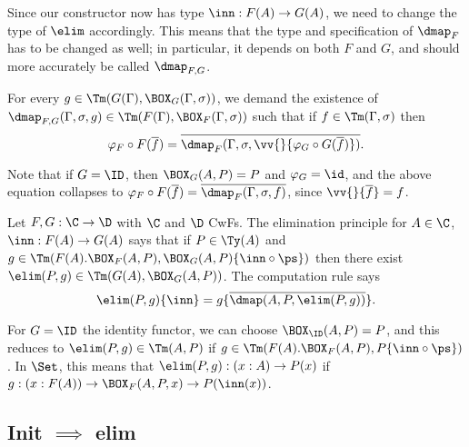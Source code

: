 \documentclass{article}
\begin{document}
Since our constructor now has type $\inn : F(A) \to G(A)$, we need to
change the type of $\elim$ accordingly. This means that the type and
specification of $\dmap_F$ has to be changed as well; in particular,
it depends on both $F$ and $G$, and should more accurately be called $\dmap_{F,G}$.

\begin{definition}
For every $g \in \Tm(G(\Gamma), \BOX_G(\Gamma, \sigma))$, we demand the existence of
$\dmap_{F,G}(\Gamma, \sigma, g) \in \Tm(F(\Gamma), \BOX_F(\Gamma, \sigma))$
such that if $f \in \Tm(\Gamma, \sigma)$ then
\[
\varphi_F \circ F(\overline{f}) = \overline{\dmap_F(\Gamma, \sigma,
  \vv{}\{\varphi_G \circ G(\overline{f})\})}.
\]
\end{definition}

Note that if $G = \ID$, then $\BOX_G(A, P) = P$ and $\varphi_G =
\id$, and the above equation collapses to $\varphi_F \circ
F(\overline{f}) = \overline{\dmap_F(\Gamma, \sigma, f)}$, since $\vv{}\{\overline{f}\} = f$.


Let $F, G : \C \to \D$ with $\C$ and $\D$ CwFs. The elimination
principle for $A \in \C$, $\inn : F(A) \to G(A)$ says that if $P \in
\Ty(A)$ and $g \in \Tm(F(A).\BOX_F(A, P), \BOX_G(A, P)\{\inn
\circ \ps\})$ then there exist $\elim(P, g) \in \Tm(G(A), \BOX_G(A,
P))$. The computation rule says
\[
\elim(P, g)\{\inn\} = g\{\overline{\dmap(A, P, \elim(P, g))}\}.
\]

For $G = \ID$ the identity functor, we can choose $\BOX_{\ID}(A, P)
= P$, and this reduces to $\elim(P, g) \in \Tm(A, P)$ if $g \in
\Tm(F(A).\BOX_F(A, P), P\{\inn \circ \ps\})$. In $\Set$, this means
that $\elim(P, g) : (x : A) \to P(x)$ if $g : (x : F(A)) \to
\BOX_F(A, P, x) \to P(\inn(x))$.


\subsection{Init $\implies$ elim}
\end{document}
